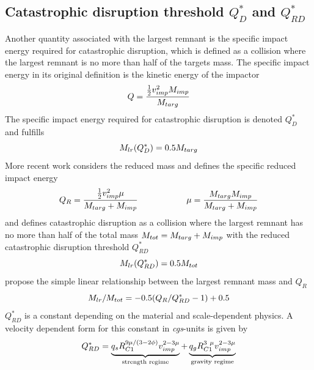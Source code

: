\subsection{Catastrophic disruption threshold $Q^*_D$ and $Q^*_{RD}$}
Another quantity associated with the largest remnant is the specific impact energy required for catastrophic disruption, which is defined as a collision where the largest remnant is no more than half of the targets mass. The specific impact energy in its original definition \cite{Benz1999Icar..142....5B} is the kinetic energy of the impactor 
\begin{equation}
Q = \frac{ \frac{1}{2} v_{imp}^2 M_{imp} }{M_{targ}} 
\end{equation}
The specific impact energy required for catastrophic disruption is denoted $Q^*_D$ and fulfills
\begin{equation}
M_{lr}(Q^*_D) = 0.5 M_{targ}
\end{equation}
More recent work \citep{Stewart:2009p3265, 2009ApJ...700L.118M, 2010ApJ...712L..73M, Leinhardt:2011p4060} considers the reduced mass and defines the specific reduced impact energy 
\begin{equation}
\label{ch03_eq005}
Q_R = \frac{ \frac{1}{2} v_{imp}^2 \mu }{M_{targ} + M_{imp}} \hspace{2.0cm} \mu = \frac{M_{targ} M_{imp}}{M_{targ} + M_{imp}} 
\end{equation}
and defines catastrophic disruption as a collision where the largest remnant has no more than half of the total mass $M_{tot} = M_{targ} + M_{imp}$ with the reduced catastrophic disruption threshold $Q^*_{RD}$
\begin{equation}
M_{lr}(Q^*_{RD}) = 0.5 M_{tot}
\end{equation}
\cite{Stewart:2009p3265} propose the simple linear relationship between the largest remnant mass and $Q_R$
\begin{equation}
\label{ch03_eq003}
M_{lr} / M_{tot} = - 0.5 ( Q_R / Q^*_{RD} - 1 ) + 0.5
\end{equation}
$Q^*_{RD}$ is a constant depending on the material and scale-dependent physics. A velocity dependent form for this constant in \emph{cgs}-units is given by
\begin{equation}
\label{ch03_eq004}
Q^*_{RD} = \underbrace{ q_s R^{9\mu/(3-2\phi)}_{C1} \vimp^{2-3\mu} }_{\textrm{strength regime} } + \underbrace{ q_g R^{3 \mu}_{C1} \vimp^{2-3\mu}}_{\textrm{gravity regime}}
\end{equation}

